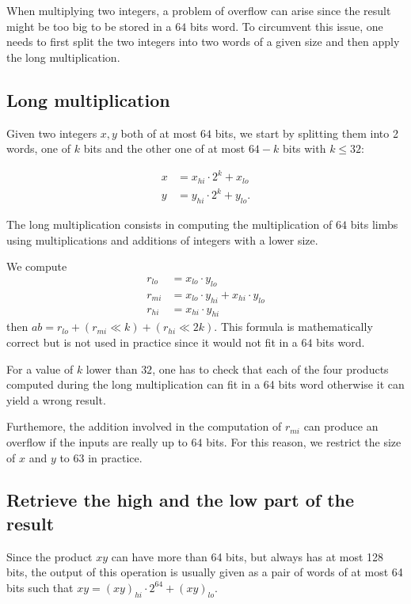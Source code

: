 \documentclass[a4paper]{article}
\begin{document}
When multiplying two integers, a problem of overflow can arise since the result might be too big to be stored in a $64$ bits word. 
To circumvent this issue, one needs to first split the two integers into two words of a given size and then apply the long multiplication.

\subsection{Long multiplication}
Given two integers $x,y$ both of at most $64$ bits, we start by splitting them into 2 words, one of $k$ bits and the other one of at most $64-k$
bits with $k\leq32$:

\begin{align*}
    x &= x_{hi}\cdot 2^{k} + x_{lo} \\
    y &= y_{hi}\cdot 2^{k} + y_{lo}.
\end{align*}

The long multiplication consists in computing the multiplication of $64$ bits limbs using multiplications and additions of
integers with a lower size.

We compute
\begin{align*}
    r_{lo} &= x_{lo}\cdot y_{lo} \\
    r_{mi} &= x_{lo}\cdot y_{hi} + x_{hi}\cdot y_{lo} \\
    r_{hi} &= x_{hi}\cdot y_{hi}
\end{align*}
then $ab = r_{lo} + (r_{mi} \ll k) + (r_{hi} \ll 2k)$. This formula is mathematically correct but is not used in practice
since it would not fit in a $64$ bits word. 

For a value of $k$ lower than $32$, one has to check that each of the four products computed during the long multiplication can fit in a
64 bits word otherwise it can yield a wrong result.

Furthemore, the addition involved in the computation of $r_{mi}$ can produce an overflow if the inputs are really up to $64$ bits.
For this reason, we restrict the size of $x$ and $y$ to $63$ in practice. 

\subsection{Retrieve the high and the low part of the result}

Since the product $xy$ can have more than 64 bits, but always has at most 128 bits, the output of this operation is usually given as a pair of words of at most 64 
bits such that $xy = (xy)_{hi}\cdot 2^{64} + (xy)_{lo}$.
\end{document}
